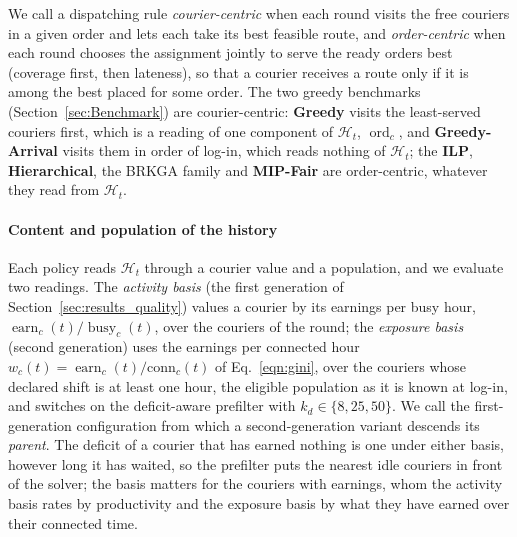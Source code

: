 \documentclass[a4paper,11pt,review,3p,authoryear]{elsarticle}
\newcommand{\Hist}{\mathcal{H}}
\newcommand{\conn}{\mathrm{conn}}
\DeclareMathOperator{\earn}{earn}
\DeclareMathOperator{\busy}{busy}
\DeclareMathOperator{\ord}{ord}
\begin{document}
We call a dispatching rule \emph{courier-centric} when each round visits the free couriers in a given order and lets each take its best feasible route, and \emph{order-centric} when each round chooses the assignment jointly to serve the ready orders best (coverage first, then lateness), so that a courier receives a route only if it is among the best placed for some order. The two greedy benchmarks (Section~\ref{sec:Benchmark}) are courier-centric: \textbf{Greedy} visits the least-served couriers first, which is a reading of one component of $\Hist_t$, $\ord_c$, and \textbf{Greedy-Arrival} visits them in order of log-in, which reads nothing of $\Hist_t$; the \textbf{ILP}, \textbf{Hierarchical}, the BRKGA family and \textbf{MIP-Fair} are order-centric, whatever they read from $\Hist_t$.

\paragraph{Content and population of the history} Each policy reads $\Hist_t$ through a courier value and a population, and we evaluate two readings. The \emph{activity basis} (the first generation of Section~\ref{sec:results_quality}) values a courier by its earnings per busy hour, $\earn_c(t)/\busy_c(t)$, over the couriers of the round; the \emph{exposure basis} (second generation) uses the earnings per connected hour $w_c(t) = \earn_c(t)/\conn_c(t)$ of Eq.~\eqref{eqn:gini}, over the couriers whose declared shift is at least one hour, the eligible population as it is known at log-in, and switches on the deficit-aware prefilter with $k_d \in \{8, 25, 50\}$. We call the first-generation configuration from which a second-generation variant descends its \emph{parent}. The deficit of a courier that has earned nothing is one under either basis, however long it has waited, so the prefilter puts the nearest idle couriers in front of the solver; the basis matters for the couriers with earnings, whom the activity basis rates by productivity and the exposure basis by what they have earned over their connected time.
\end{document}
